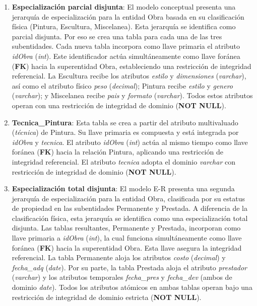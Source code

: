 \begin{enumerate}
	\item \textbf{Especialización parcial disjunta}: El modelo conceptual presenta una jerarquía de especialización para la entidad Obra basada en su clasificación física (Pintura, Escultura, Miscelanea). Esta jerarquía se identifica como parcial disjunta. Por eso se crea una tabla para cada una de las tres subentidades. Cada nueva tabla incorpora como llave primaria el atributo \textit{idObra} (\textit{int}). Este identificador actúa simultáneamente como llave foránea (\textbf{FK}) hacia la superentidad Obra, estableciendo una restricción de integridad referencial. La Escultura recibe los atributos \textit{estilo} y \textit{dimensiones} (\textit{varchar}), así como el atributo físico \textit{peso} (\textit{decimal}); Pintura recibe \textit{estilo} y \textit{genero} (\textit{varchar}); y Miscelanea recibe \textit{pais} y \textit{formato} (\textit{varchar}). Todos estos atributos operan con una restricción de integridad de dominio (\textbf{NOT NULL}).

	\item \textbf{Tecnica\_Pintura}: Esta tabla se crea a partir del atributo multivaluado (\textit{técnica}) de Pintura. Su llave primaria es compuesta y está integrada por \textit{idObra} y \textit{tecnica}. El atributo \textit{idObra} (\textit{int}) actúa al mismo tiempo como llave foránea (\textbf{FK}) hacia la relación Pintura, aplicando una restricción de integridad referencial. El atributo \textit{tecnica} adopta el dominio \textit{varchar} con restricción de integridad de dominio (\textbf{NOT NULL}).

	\item \textbf{Especialización total disjunta}: El modelo E-R presenta una segunda jerarquía de especialización para la entidad Obra, clasificada por su estatus de propiedad en las subentidades Permanente y Prestada. A diferencia de la clasificación física, esta jerarquía se identifica como una especialización total disjunta. Las tablas resultantes, Permanente y Prestada, incorporan como llave primaria a \textit{idObra} (\textit{int}), la cual funciona simultáneamente como llave foránea (\textbf{FK}) hacia la superentidad Obra. Esta llave asegura la integridad referencial. La tabla Permanente aloja los atributos \textit{costo} (\textit{decimal}) y \textit{fecha\_adq} (\textit{date}). Por su parte, la tabla Prestada aloja el atributo \textit{prestador} (\textit{varchar}) y los atributos temporales \textit{fecha\_pres} y \textit{fecha\_dev} (ambos de dominio \textit{date}). Todos los atributos atómicos en ambas tablas operan bajo una restricción de integridad de dominio estricta (\textbf{NOT NULL}).


\end{enumerate}
